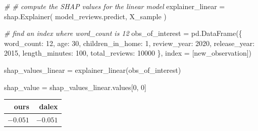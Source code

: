 \documentclass[
  letterpaper,
]{krantz}
\newenvironment{Shaded}{}{}
\newcommand{\CommentTok}[1]{\textcolor[rgb]{0.38,0.63,0.69}{\textit{#1}}}
\newcommand{\DecValTok}[1]{\textcolor[rgb]{0.25,0.63,0.44}{#1}}
\newcommand{\NormalTok}[1]{#1}
\newcommand{\OperatorTok}[1]{\textcolor[rgb]{0.40,0.40,0.40}{#1}}
\newcommand{\StringTok}[1]{\textcolor[rgb]{0.25,0.44,0.63}{#1}}
\begin{document}
\begin{Shaded}
\begin{Highlighting}[]
\CommentTok{\# \# compute the SHAP values for the linear model}
\NormalTok{explainer\_linear }\OperatorTok{=}\NormalTok{ shap.Explainer(}
\NormalTok{    model\_reviews.predict, }
\NormalTok{    X\_sample   }
\NormalTok{)}

\CommentTok{\# find an index where word\_count is 12}
\NormalTok{obs\_of\_interest }\OperatorTok{=}\NormalTok{ pd.DataFrame(\{}
    \StringTok{\textquotesingle{}word\_count\textquotesingle{}}\NormalTok{: }\DecValTok{12}\NormalTok{,}
    \StringTok{\textquotesingle{}age\textquotesingle{}}\NormalTok{: }\DecValTok{30}\NormalTok{,}
    \StringTok{\textquotesingle{}children\_in\_home\textquotesingle{}}\NormalTok{: }\DecValTok{1}\NormalTok{,}
    \StringTok{\textquotesingle{}review\_year\textquotesingle{}}\NormalTok{: }\DecValTok{2020}\NormalTok{,}
    \StringTok{\textquotesingle{}release\_year\textquotesingle{}}\NormalTok{: }\DecValTok{2015}\NormalTok{,}
    \StringTok{\textquotesingle{}length\_minutes\textquotesingle{}}\NormalTok{: }\DecValTok{100}\NormalTok{,}
    \StringTok{\textquotesingle{}total\_reviews\textquotesingle{}}\NormalTok{: }\DecValTok{10000}
\NormalTok{\}, index }\OperatorTok{=}\NormalTok{ [}\StringTok{\textquotesingle{}new\_observation\textquotesingle{}}\NormalTok{])}

\NormalTok{shap\_values\_linear }\OperatorTok{=}\NormalTok{ explainer\_linear(obs\_of\_interest)}

\NormalTok{shap\_value }\OperatorTok{=}\NormalTok{ shap\_values\_linear.values[}\DecValTok{0}\NormalTok{, }\DecValTok{0}\NormalTok{]}
\end{Highlighting}
\end{Shaded}

\begin{table}

\caption{\label{tbl-shap-values-comparison}\textbf{?(caption)}}\begin{minipage}[t]{\linewidth}
\subcaption{\label{tbl-shap-values-comparison-1}}

{\centering 

\begin{longtable*}{rr}
\toprule
ours & dalex \\ 
\midrule\addlinespace[2.5pt]
\textcolor[HTML]{404040}{$-0.051$} & \textcolor[HTML]{404040}{$-0.051$} \\ 
\bottomrule
\end{longtable*}

}

\end{minipage}%

\end{table}
\end{document}
